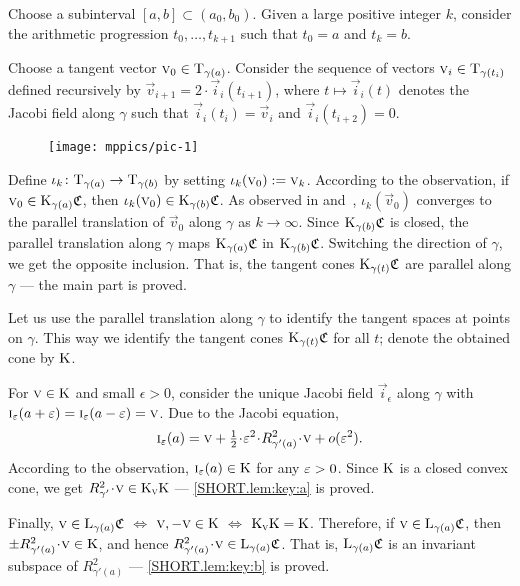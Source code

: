 \documentclass[a4paper,10pt]{article}
\begin{document}
Choose a subinterval $[a,b] \subset (a_0,b_0)$.
Given a large positive integer $k$, consider the arithmetic progression
$t_0,\dots,t_{k+1}$ such that $t_0=a$ and $t_k=b$.

Choose a tangent vector $\text{\sc{v}}_0\in\mathrm{T}_{\gamma(a)}$.
Consider the sequence of vectors $\vec{v}_i\z\in\T_{\gamma(t_i)}$ defined recursively by $\vec{v}_{i+1}=2\cdot \vec i_i(t_{i+1})$, where $t\mapsto \vec i_i(t)$ denotes the Jacobi field along $\gamma$ such that $\vec i_i(t_i)=\vec{v}_i$ and $\vec i_i(t_{i+2})=0$.

\begin{figure}[ht!]\vskip-0mm\centering\texttt{[image: mppics/pic-1]}\end{figure}

Define $\iota_k\colon\mathrm{T}_{\gamma(a)}\to \mathrm{T}_{\gamma(b)}$ by setting $\iota_k(\text{\sc{v}}_0)\mathrel{{:}{=}} \text{\sc{v}}_k$.
According to the observation, if $\text{\sc{v}}_0\in \mathrm{K}_{\gamma(a)}\mathfrak{C}$, then $\iota_k(\text{\sc{v}}_0)\in \mathrm{K}_{\gamma(b)}\mathfrak{C}$.
As observed in \cite{Ber-Nik} and~\cite{Petruninpar}, $\iota_k(\vec v_0)$ converges to the parallel translation of $\vec v_0$ along $\gamma$ as $k\to \infty$.
Since $\mathrm{K}_{\gamma(b)}\mathfrak{C}$ is closed,
the parallel translation along $\gamma$ maps $\mathrm{K}_{\gamma(a)}\mathfrak{C}$ in $\mathrm{K}_{\gamma(b)}\mathfrak{C}$.
Switching the direction of $\gamma$, we get the opposite inclusion.
That is, the tangent cones $\mathrm{K}_{\gamma(t)}\mathfrak{C}$ are parallel along $\gamma$ --- the main part is proved.

Let us use the parallel translation along $\gamma$ to identify the tangent spaces at points on $\gamma$.
This way we identify the tangent cones $\mathrm{K}_{\gamma(t)}\mathfrak{C}$ for all $t$;
denote the obtained cone by $\mathrm{K}$.

For $\text{\sc{v}}\in \mathrm{K}$ and small $\epsilon>0$, consider the unique Jacobi field $\vec i_\epsilon$ along $\gamma$ with $\vec i_\epsilon (a+\eps)\z=\vec i_\epsilon(a-\eps)=\vec{v}$.
Due to the Jacobi equation,
\[\vec i_\epsilon (a)=\vec{v} +\tfrac12\cdot\eps^2\cdot R^2_{\gamma'(a)}\cdot \vec{v} +o(\eps^2).\]
According to the observation, $\text{\sc{i}}_\varepsilon(a)\in \mathrm{K}$ for any $\varepsilon>0$.
Since $\mathrm{K}$ is a closed convex cone, we get $R^2_{\gamma'}\cdot \vec{v}\z\in \K_\vec{v}\K$ --- \ref{SHORT.lem:key:a} is proved.

Finally,
$\text{\sc{v}}\in \mathrm{L}_{\gamma(a)}\mathfrak{C}$ $
\iff$
$\text{\sc{v}}, -\text{\sc{v}}\in \mathrm{K}$
$\iff$
$\mathrm{K}_{\text{\sc{v}}}\mathrm{K}=\mathrm{K}$.
Therefore, if $\text{\sc{v}}\in \mathrm{L}_{\gamma(a)}\mathfrak{C}$, then $\pm R^2_{\gamma'(a)}\cdot \vec{v}\in \K$, and hence $R^2_{\gamma'(a)}\cdot \vec{v}\in \L_{\gamma(a)}\mathfrak{C}$.
That is, $\mathrm{L}_{\gamma(a)}\mathfrak{C}$ is an invariant subspace of $R^2_{\gamma'(a)}$ --- \ref{SHORT.lem:key:b} is proved.
\qeds
\end{document}
